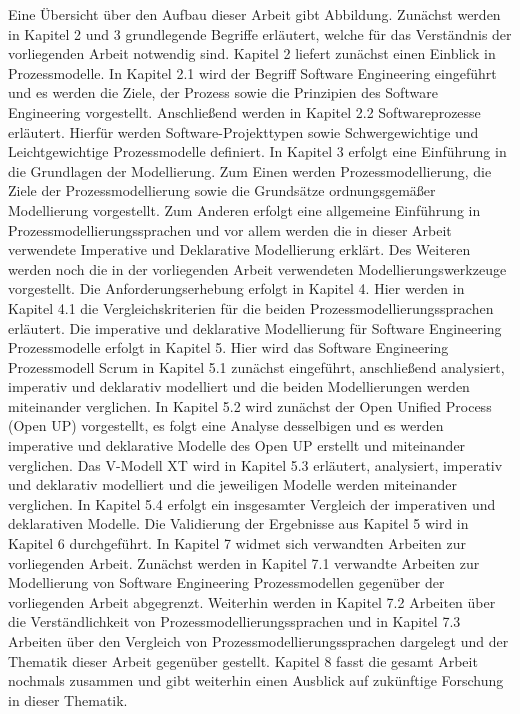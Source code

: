 Eine Übersicht über den Aufbau dieser Arbeit gibt Abbildung.
Zunächst werden in Kapitel 2 und 3 grundlegende Begriffe erläutert, welche für das Verständnis der vorliegenden Arbeit notwendig sind.\newline
Kapitel 2 liefert zunächst einen Einblick in Prozessmodelle. In Kapitel 2.1 wird der Begriff Software Engineering eingeführt und es werden die Ziele, der Prozess sowie die Prinzipien des Software Engineering vorgestellt. Anschließend werden in Kapitel 2.2 Softwareprozesse erläutert. Hierfür werden Software-Projekttypen sowie Schwergewichtige und Leichtgewichtige Prozessmodelle definiert.\newline
In Kapitel 3 erfolgt eine Einführung in die Grundlagen der Modellierung. Zum Einen werden Prozessmodellierung, die Ziele der Prozessmodellierung sowie die Grundsätze ordnungsgemäßer Modellierung vorgestellt. Zum Anderen erfolgt eine allgemeine Einführung in Prozessmodellierungssprachen und vor allem werden die in dieser Arbeit verwendete Imperative und Deklarative Modellierung erklärt. Des Weiteren werden noch die in der vorliegenden Arbeit verwendeten Modellierungswerkzeuge vorgestellt.\newline
Die Anforderungserhebung erfolgt in Kapitel 4. Hier werden in Kapitel 4.1 die Vergleichskriterien für die beiden Prozessmodellierungssprachen erläutert.\newline
Die imperative und deklarative Modellierung für Software Engineering Prozessmodelle erfolgt in Kapitel 5. Hier wird das Software Engineering Prozessmodell Scrum in Kapitel 5.1 zunächst eingeführt, anschließend analysiert, imperativ und deklarativ modelliert und die beiden Modellierungen werden miteinander verglichen. In Kapitel 5.2 wird zunächst der Open Unified Process (Open UP) vorgestellt, es folgt eine Analyse desselbigen und es werden imperative und deklarative Modelle des Open UP erstellt und miteinander verglichen. Das V-Modell XT wird in Kapitel 5.3 erläutert, analysiert, imperativ und deklarativ modelliert und die jeweiligen Modelle werden miteinander verglichen. In Kapitel 5.4 erfolgt ein insgesamter Vergleich der imperativen und deklarativen Modelle.\newline
Die Validierung der Ergebnisse aus Kapitel 5 wird in Kapitel 6 durchgeführt.
In Kapitel 7 widmet sich verwandten Arbeiten zur vorliegenden Arbeit. Zunächst werden in Kapitel 7.1 verwandte Arbeiten zur Modellierung von Software Engineering Prozessmodellen gegenüber der vorliegenden Arbeit abgegrenzt. Weiterhin werden in Kapitel 7.2 Arbeiten über die Verständlichkeit von Prozessmodellierungssprachen und in Kapitel 7.3 Arbeiten über den Vergleich von Prozessmodellierungssprachen dargelegt und der Thematik dieser Arbeit gegenüber gestellt.\newline
Kapitel 8 fasst die gesamt Arbeit nochmals zusammen und gibt weiterhin einen Ausblick auf zukünftige Forschung in dieser Thematik.

